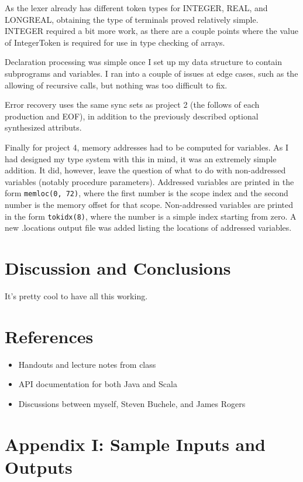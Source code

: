 \documentclass[paper=letter, fontsize=11pt, oneside, titlepage]{scrartcl}
\begin{document}
As the lexer already has different token types for INTEGER, REAL, and LONGREAL, obtaining the type of terminals proved relatively simple.  INTEGER required a bit more work, as there are a couple points where the value of IntegerToken is required for use in type checking of arrays.  

Declaration processing was simple once I set up my data structure to contain subprograms and variables.  I ran into a couple of issues at edge cases, such as the allowing of recursive calls, but nothing was too difficult to fix.  

Error recovery uses the same sync sets as project 2 (the follows of each production and EOF), in addition to the previously described optional synthesized attributs.

Finally for project 4, memory addresses had to be computed for variables.  As I had designed my type system with this in mind, it was an extremely simple addition.  It did, however, leave the question of what to do with non-addressed variables (notably procedure parameters).  Addressed variables are printed in the form \lstinline{memloc(0, 72)}, where the first number is the scope index and the second number is the memory offset for that scope.  Non-addressed variables are printed in the form \lstinline{tokidx(8)}, where the number is a simple index starting from zero.  A new .locations output file was added listing the locations of addressed variables.

\section{Discussion and Conclusions}\label{conclusions}

It's pretty cool to have all this working.

\section{References}\label{ref}

\begin{itemize}
    \item Handouts and lecture notes from class
    \item API documentation for both Java and Scala
    \item Discussions between myself, Steven Buchele, and James Rogers
\end{itemize}

\section{Appendix I: Sample Inputs and Outputs}\label{sample}
\end{document}
